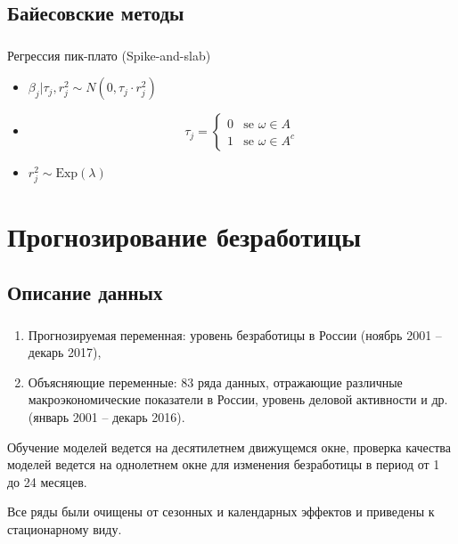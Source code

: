 \documentclass[c, dvipsnames]{beamer}  %
\begin{document}
\subsection{Байесовские методы}
\begin{frame}
\frametitle{\insertsection} 
\framesubtitle{\insertsubsection}

\begin{block}{Регрессия пик-плато (Spike-and-slab)}

    \begin{itemize}
        \item $\beta_j|\tau_j, r^2_j \sim N(0,\tau_j\cdot r^2_j )$
        \item \begin{equation}
             \tau_j = 
 \begin{cases}
   0 &\text{se $\omega\in A$}\\
   1 &\text{se $\omega \in A^c$}
 \end{cases}
        \end{equation}
        \item $r^2_j \sim \text{Exp}(\lambda)$ 
    \end{itemize}
    
    
\end{block}


\end{frame}


\section{Прогнозирование безработицы}
\subsection{Описание данных}
\begin{frame}
\frametitle{\insertsection} 
\framesubtitle{\insertsubsection}
\begin{enumerate}
    \item Прогнозируемая переменная: уровень безработицы в России (ноябрь 2001 -- декарь 2017),
    \item Объясняющие переменные: 83 ряда данных, отражающие различные макроэкономические показатели в России, уровень деловой активности и др. (январь 2001 -- декарь 2016).
\end{enumerate}
    Обучение моделей ведется на десятилетнем движущемся окне, проверка качества моделей ведется на однолетнем окне для изменения безработицы в период от 1 до 24 месяцев.
    
    Все ряды были очищены от сезонных и календарных эффектов и приведены к стационарному виду.
\end{frame}
\end{document}
